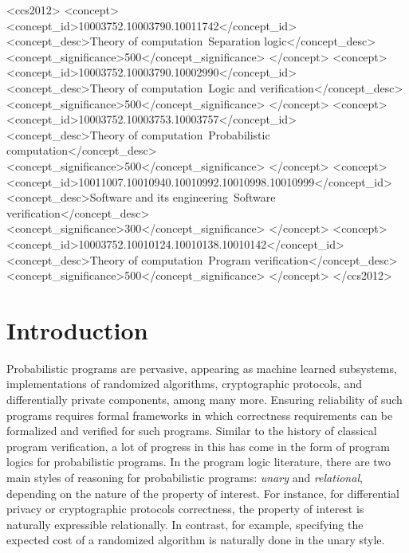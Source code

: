 \documentclass[acmsmall,nonacm,screen,appendix]{acmart}
\begin{document}
\begin{CCSXML}
<ccs2012>
   <concept>
       <concept_id>10003752.10003790.10011742</concept_id>
       <concept_desc>Theory of computation~Separation logic</concept_desc>
       <concept_significance>500</concept_significance>
       </concept>
   <concept>
       <concept_id>10003752.10003790.10002990</concept_id>
       <concept_desc>Theory of computation~Logic and verification</concept_desc>
       <concept_significance>500</concept_significance>
       </concept>
   <concept>
       <concept_id>10003752.10003753.10003757</concept_id>
       <concept_desc>Theory of computation~Probabilistic computation</concept_desc>
       <concept_significance>500</concept_significance>
       </concept>
   <concept>
       <concept_id>10011007.10010940.10010992.10010998.10010999</concept_id>
       <concept_desc>Software and its engineering~Software verification</concept_desc>
       <concept_significance>300</concept_significance>
       </concept>
   <concept>
       <concept_id>10003752.10010124.10010138.10010142</concept_id>
       <concept_desc>Theory of computation~Program verification</concept_desc>
       <concept_significance>500</concept_significance>
       </concept>
 </ccs2012>
\end{CCSXML}




\maketitle

\section{Introduction}\label{sec:intro}
Probabilistic programs are pervasive, appearing as
  machine learned subsystems,
  implementations of randomized algorithms,
  cryptographic protocols, and
  differentially private components,
among many more.
Ensuring reliability of such programs requires formal frameworks
in which correctness requirements can be formalized and verified
for such programs.
Similar to the history of classical program verification,
a lot of progress in this has come in the form of program logics
for probabilistic programs.
In the program logic literature,
there are two main styles of reasoning for probabilistic programs:
\emph{unary} and \emph{relational},
depending on the nature of the property of interest.
For instance, for differential privacy or cryptographic protocols correctness,
the property of interest is naturally expressible relationally.
In contrast, for example, specifying the expected cost of a
randomized algorithm is naturally done in the unary style.
\end{document}
